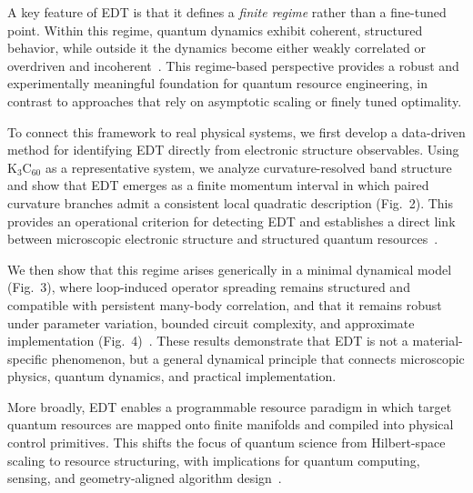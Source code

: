 \documentclass[twocolumn,10pt]{article}
\begin{document}
A key feature of EDT is that it defines a \emph{finite regime} rather than a fine-tuned point. Within this regime, quantum dynamics exhibit coherent, structured behavior, while outside it the dynamics become either weakly correlated or overdriven and incoherent~\cite{Larkin1969,Swingle2018}. This regime-based perspective provides a robust and experimentally meaningful foundation for quantum resource engineering, in contrast to approaches that rely on asymptotic scaling or finely tuned optimality.

To connect this framework to real physical systems, we first develop a data-driven method for identifying EDT directly from electronic structure observables. Using K$_3$C$_{60}$ as a representative system, we analyze curvature-resolved band structure and show that EDT emerges as a finite momentum interval in which paired curvature branches admit a consistent local quadratic description (Fig.~2). This provides an operational criterion for detecting EDT and establishes a direct link between microscopic electronic structure and structured quantum resources~\cite{Gunnarsson1997,Capone2009}.

We then show that this regime arises generically in a minimal dynamical model (Fig.~3), where loop-induced operator spreading remains structured and compatible with persistent many-body correlation, and that it remains robust under parameter variation, bounded circuit complexity, and approximate implementation (Fig.~4)~\cite{Lloyd1996,Childs2019}. These results demonstrate that EDT is not a material-specific phenomenon, but a general dynamical principle that connects microscopic physics, quantum dynamics, and practical implementation.

More broadly, EDT enables a programmable resource paradigm in which target quantum resources are mapped onto finite manifolds and compiled into physical control primitives. This shifts the focus of quantum science from Hilbert-space scaling to resource structuring, with implications for quantum computing, sensing, and geometry-aligned algorithm design~\cite{Preskill2018,Verstraete2008}.

\end{document}
